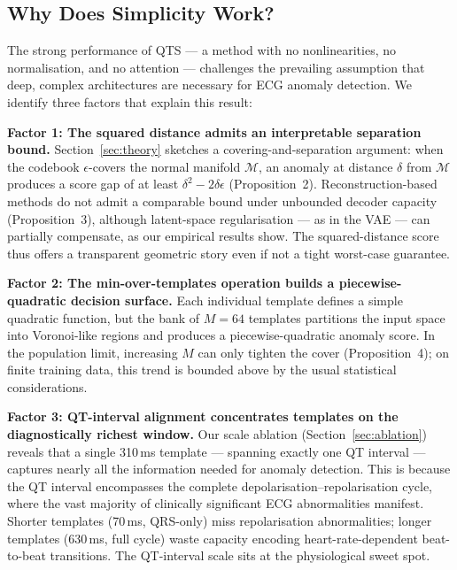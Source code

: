 \documentclass{iopjournal}
\begin{document}
\subsection{Why Does Simplicity Work?}

The strong performance of QTS --- a method with no nonlinearities, no normalisation, and no attention --- challenges the prevailing assumption that deep, complex architectures are necessary for ECG anomaly detection. We identify three factors that explain this result:

\textbf{Factor 1: The squared distance admits an interpretable separation bound.} Section~\ref{sec:theory} sketches a covering-and-separation argument: when the codebook $\epsilon$-covers the normal manifold $\mathcal{M}$, an anomaly at distance $\delta$ from $\mathcal{M}$ produces a score gap of at least $\delta^2 - 2\delta\epsilon$ (Proposition~2). Reconstruction-based methods do not admit a comparable bound under unbounded decoder capacity (Proposition~3), although latent-space regularisation --- as in the VAE --- can partially compensate, as our empirical results show. The squared-distance score thus offers a transparent geometric story even if not a tight worst-case guarantee.

\textbf{Factor 2: The min-over-templates operation builds a piecewise-quadratic decision surface.} Each individual template defines a simple quadratic function, but the bank of $M = 64$ templates partitions the input space into Voronoi-like regions and produces a piecewise-quadratic anomaly score. In the population limit, increasing $M$ can only tighten the cover (Proposition~4); on finite training data, this trend is bounded above by the usual statistical considerations.

\textbf{Factor 3: QT-interval alignment concentrates templates on the diagnostically richest window.} Our scale ablation (Section~\ref{sec:ablation}) reveals that a single 310\,ms template --- spanning exactly one QT interval --- captures nearly all the information needed for anomaly detection. This is because the QT interval encompasses the complete depolarisation--repolarisation cycle, where the vast majority of clinically significant ECG abnormalities manifest. Shorter templates (70\,ms, QRS-only) miss repolarisation abnormalities; longer templates (630\,ms, full cycle) waste capacity encoding heart-rate-dependent beat-to-beat transitions. The QT-interval scale sits at the physiological sweet spot.
\end{document}
